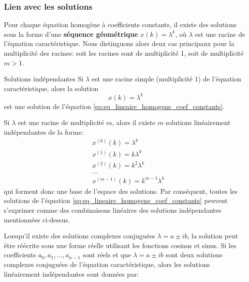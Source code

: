             \subsubsection{Lien avec les solutions}
                Pour chaque équation homogène à coefficients constants, il existe des solutions sous la forme d'une \textbf{séquence géométrique} $x(k) = \lambda^k$, où $\lambda$ est une racine de l'équation caractéristique. Nous distinguons alors deux cas principaux pour la multiplicité des racines: soit les racines sont de multiplicité 1, soit de multiplicité $m > 1$.
                \begin{theorem}{Solutions indépendantes}
                    Si $\lambda$ est une racine simple (multiplicité $1$) de l'équation caractéristique, alors la solution
                    \begin{equation}
                        x(k) = \lambda^k
                    \end{equation}
                    est une solution de l'équation \eqref{eq:eq_lineaire_homogene_coef_constants}.
                    
                    Si $\lambda$ est une racine de multiplicité $m$, alors il existe $m$ solutions linéairement indépendantes de la forme:
                    \begin{equation}
                        \begin{split}
                            &x^{(0)}(k) = \lambda^k \\ 
                            &x^{(1)}(k) = k \lambda^k \\ 
                            &x^{(2)}(k) = k^2 \lambda^k \\ 
                            &\dots \\ 
                            &x^{(m-1)}(k) = k^{m-1} \lambda^k
                        \end{split}
                    \end{equation}
                    qui forment donc une base de l'espace des solutions.
                    Par conséquent, toutes les solutions de l'équation \eqref{eq:eq_lineaire_homogene_coef_constants} peuvent s'exprimer comme des combinaisons linéaires des solutions indépendantes mentionnées ci-dessus.
                \end{theorem}
                Lorsqu'il existe des solutions complexes conjuguées $\lambda = a \pm ib$, la solution peut être réécrite sous une forme réelle utilisant les fonctions cosinus et sinus.
                Si les coefficients $a_0, a_1, \dots, a_{n-1}$ sont réels et que $\lambda = a \pm ib$ sont deux solutions complexes conjuguées de l'équation caractéristique, alors les solutions linéairement indépendantes sont données par:
